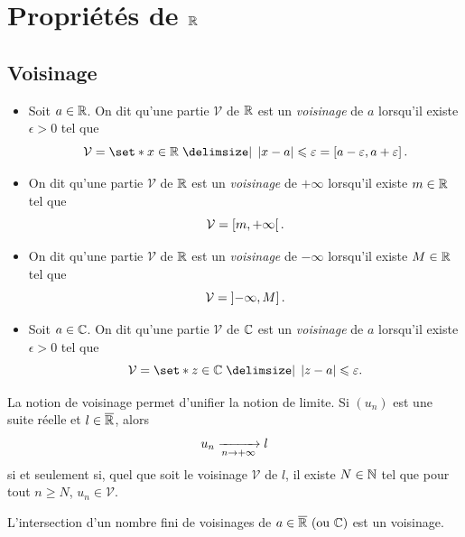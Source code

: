 \documentclass{magnolia}
\begin{document}



\section{Propriétés de $\mathbb{R}$}

\subsection{Voisinage}

\begin{definition}[utile=-3]
\begin{itemize}
\item Soit $a\in\mathbb{R}$. On dit qu'une partie $\mathcal{V}$ de $\mathbb{R}$ est un \emph{voisinage} de $a$ lorsqu'il existe $\epsilon>0$ tel que 
  \[\mathcal{V}=\enstq{x\in\R}{\abs{x-a}\leq\epsilon} 
    =\interf{a-\epsilon}{a+\epsilon}.\]
\item On dit qu'une partie $\mathcal{V}$ de $\mathbb{R}$ est un \emph{voisinage} de $+\infty$
  lorsqu'il existe $m\in\mathbb{R}$ tel que
  \[\mathcal{V}=\left[m,+\infty\right[.\]
\item On dit qu'une partie $\mathcal{V}$ de $\mathbb{R}$ est un \emph{voisinage} de $-\infty$
  lorsqu'il existe $M\in\mathbb{R}$ tel que
  \[\mathcal{V}=\left]-\infty,M\right].\]
\item Soit $a\in\mathbb{C}$. On dit qu'une partie $\mathcal{V}$ de $\mathbb{C}$ est un \emph{voisinage} de $a$ lorsqu'il existe $\epsilon>0$ tel que
  \[\mathcal{V}=\enstq{z\in\C}{\abs{z-a}\leq\epsilon}.\]
\end{itemize}
\end{definition}

\begin{remarqueUnique}
\remarque La notion de voisinage permet d'unifier la notion de limite. Si $(u_n)$ est
  une suite réelle et $l\in\overline{\mathbb{R}}$, alors
  \[u_n\xrightarrow[n\rightarrow +\infty]{}l\]
  si et seulement si, quel que soit le voisinage $\mathcal{V}$ de $l$, il
  existe $N\in\mathbb{N}$ tel que pour tout $n\geq N$, $u_n\in\mathcal{V}$.
\end{remarqueUnique}

\begin{proposition}
L'intersection d'un nombre fini de voisinages de $a\in\text{$\overline{\mathbb{R}}$ (ou $\mathbb{C}$)}$ est un voisinage.
\end{proposition}
\end{document}
